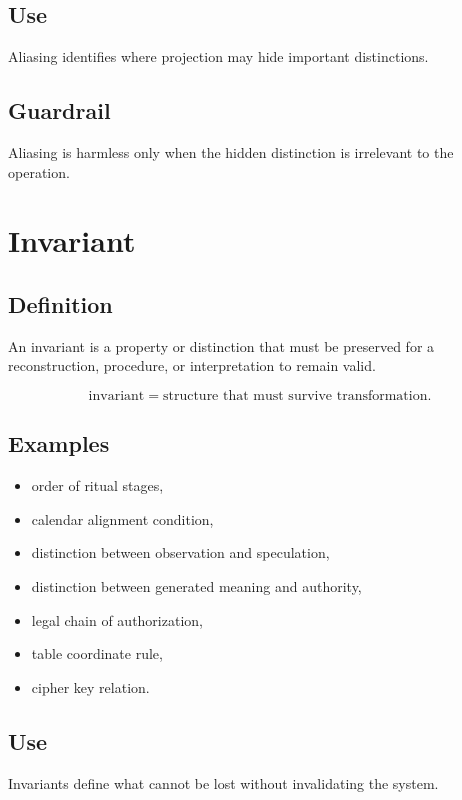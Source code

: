 \documentclass[11pt]{book}
\begin{document}
\subsection*{Use}

Aliasing identifies where projection may hide important distinctions.

\subsection*{Guardrail}

Aliasing is harmless only when the hidden distinction is irrelevant to the operation.

\section{Invariant}

\subsection*{Definition}

An invariant is a property or distinction that must be preserved for a reconstruction, procedure, or interpretation to remain valid.

\[
\text{invariant} = \text{structure that must survive transformation}.
\]

\subsection*{Examples}

\begin{itemize}
    \item order of ritual stages,
    \item calendar alignment condition,
    \item distinction between observation and speculation,
    \item distinction between generated meaning and authority,
    \item legal chain of authorization,
    \item table coordinate rule,
    \item cipher key relation.
\end{itemize}

\subsection*{Use}

Invariants define what cannot be lost without invalidating the system.
\end{document}
